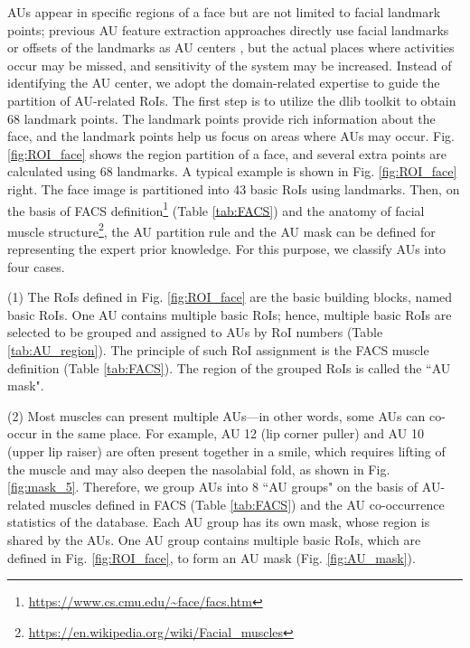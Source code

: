 \documentclass[5p,twocolumn]{elsarticle}
\begin{document}
AUs appear in specific regions of a face but are not limited to facial landmark points; previous AU feature extraction approaches directly use facial landmarks or offsets of the landmarks as AU centers \cite{li2017eac,Zhao2016,li2017action}, but the actual places where activities occur may be missed, and sensitivity of the system may be increased. Instead of identifying the AU center, we adopt the domain-related expertise to guide the partition of AU-related RoIs. The first step is to utilize the dlib \cite{king2009dlib} toolkit to obtain 68 landmark points. The landmark points provide rich information about the face, and the landmark points help us focus on areas where AUs may occur. Fig. \ref{fig:ROI_face} shows the region partition of a face, and several extra points are calculated using 68 landmarks. A typical example is shown in Fig. \ref{fig:ROI_face} right. The face image is partitioned into 43 basic RoIs using landmarks. Then, on the basis of FACS definition\footnote{\url{https://www.cs.cmu.edu/~face/facs.htm}} (Table \ref{tab:FACS}) and the anatomy of facial muscle structure\footnote{\url{https://en.wikipedia.org/wiki/Facial_muscles}}, the AU partition rule and the AU mask can be defined for representing the expert prior knowledge. For this purpose, we classify AUs into four cases.

(1) The RoIs defined in Fig. \ref{fig:ROI_face} are the basic building blocks, named basic RoIs. One AU contains multiple basic RoIs; hence, multiple basic RoIs are selected to be grouped and assigned to AUs by RoI numbers (Table \ref{tab:AU_region}). The principle of such RoI assignment is the FACS muscle definition (Table \ref{tab:FACS}). The region of the grouped RoIs is called the ``AU mask".

(2) Most muscles can present multiple AUs---in other words, some AUs can co-occur in the same place. For example, AU 12 (lip corner puller) and AU 10 (upper lip raiser) are often present together in a smile, which requires lifting of the muscle and may also deepen the nasolabial fold, as shown in Fig. \ref{fig:mask_5}. Therefore, we group AUs into 8 ``AU groups" on the basis of AU-related muscles defined in FACS (Table \ref{tab:FACS}) and the AU co-occurrence statistics of the database. Each AU group has its own mask, whose region is shared by the AUs. One AU group contains multiple basic RoIs, which are defined in Fig. \ref{fig:ROI_face}, to form an AU mask (Fig. \ref{fig:AU_mask}). 
\end{document}
